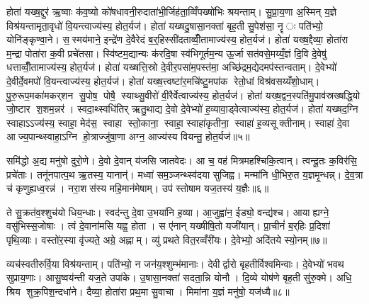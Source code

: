 होता॑ यख्ष॒द्दुर॑ ऋ॒ष्वाः क॑व॒ष्यो को॑षधावनी॒रुदाता॑भी॒र्जिह॑ता॒व्विँपख्षो॑भिः श्रयन्ताम्। सु॒प्रा॒य॒णा अ॒स्मिन् य॒ज्ञे विश्र॑यन्तामृता॒वृधो॑ वि॒यन्त्वाज्य॑स्य॒ होत॒र्यज॑। होता॑ यख्षदु॒षासा॒नक्ता॑ बृह॒ती सु॒पेश॑सा॒ नॄः पति॑भ्यो॒ योनि॑ङ्कृण्वा॒ने। स॒स्मय॑माने॒ इन्द्रे॑ण दे॒वैरेदं ब॒र्॒हिस्सी॑दताव्वीँ॒तामाज्य॑स्य॒ होत॒र्यज॑। होता॑ यख्ष॒द्दैव्या॒ होता॑रा म॒न्द्रा पोता॑रा क॒वी प्रचे॑तसा। स्वि॑ष्टम॒द्यान्यः क॑रदि॒षा स्व॑भिगूर्तम॒न्य ऊ॒र्जा सत॑वसे॒मय्यँ॒ज्ञं दि॒वि दे॒वेषु॑ धत्ताव्वीँ॒तामाज्य॑स्य॒ होत॒र्यज॑। होता॑ यख्षत्ति॒स्रो दे॒वीर॒पसा॑म॒पस्त॑मा॒ अच्छि॑द्रम॒द्येदमप॑स्तन्वताम्। दे॒वेभ्यो॑ दे॒वीर्दे॒वमपो॑ वि॒यन्त्वाज्य॑स्य॒ होत॒र्यज॑। होता॑ यख्ष॒त्त्वष्टा॑र॒मचि॑ष्टु॒मपा॑क रेतो॒धां विश्र॑वसय्यँशो॒धाम्। पु॒रु॒रूप॒मका॑मकर्‌शन सु॒पोष॒ पोषै॒ स्याथ्सु॒वीरो॑ वी॒रैर्वेत्वाज्य॑स्य॒ होत॒र्यज॑। होता॑ यख्ष॒द्वन॒स्पति॑मु॒पाव॑स्रख्षद्धि॒यो जो॒ष्टार श॒शम॒न्नर॑। स्वदा॒थ्स्वधि॑तिर् ऋतु॒थाद्य दे॒वो दे॒वेभ्यो॑ ह॒व्यावा॒ड्वेत्वाज्य॑स्य॒ होत॒र्यज॑। होता॑ यख्षद॒ग्नि स्वाहाऽऽज्य॑स्य॒ स्वाहा॒ मेद॑स॒ स्वाहा स्तो॒काना॒ स्वाहा॒ स्वाहा॑कृतीना॒ स्वाहा॑ ह॒व्यसूक्तीनाम्। स्वाहा॑ दे॒वा आज्य॒पान्थ्स्वाहा॒ऽग्नि हो॒त्राज्जु॑षा॒णा अग्न॒ आज्य॑स्य वियन्तु॒ होत॒र्यज॑॥५॥\anuvakamend[प्रि॒यमिन्द्र॑स्यास्तु॒ वेत्वाज्य॑स्य॒ होत॒र्यज॑ सु॒वीरो॑ वी॒रैर्वेत्वाज्य॑स्य॒ होत॒र्यज॑ च॒त्वारि॑ च (अ॒ग्निन्तनू॒नपा॑त॒न्नरा॒शस॑म॒ग्निमि॒ड ई॑डि॒तो ब॒र्‌हिर्दुर॑ उ॒षासा॒नक्ता॒ दैव्या॑ ति॒स्रस्त्वष्टा॑रं॒ वन॒स्पति॑म॒ग्निम्। पञ्च॒ वेत्वेको॑ वि॒यन्तु॒ द्विर्वी॒तामेको॑ वि॒यन्तु॒ द्विर्वेत्वेको॑ वियन्तु॒ होत॒र्यज॑ ॥ )]

समि॑द्धो अ॒द्य मनु॑षो दुरो॒णे। दे॒वो दे॒वान् य॑जसि जातवेदः। आ च॒ वह॑ मित्रमहश्चिकि॒त्वान्। त्वन्दू॒तः क॒विर॑सि॒ प्रचे॑ताः। तनू॑नपात्प॒थ ऋ॒तस्य॒ यानान्॑। मध्वा॑ सम॒ञ्जन्थ्स्व॑दया सुजिह्व। मन्मा॑नि धी॒भिरु॒त य॒ज्ञमृ॒न्धन्न्। दे॒व॒त्रा च॑ कृणुह्यध्व॒रन्न॑। नरा॒शस॑स्य महि॒मान॑मेषाम्। उप॑ स्तोषाम यज॒तस्य॑ य॒ज्ञैः॥६॥

ते सु॒क्रत॑व॒श्शुच॑यो धिय॒न्धाः। स्वद॑न्तु दे॒वा उ॒भया॑नि ह॒व्या। आ॒जुह्वा॑न॒ ईड्यो॒ वन्द्य॑श्च। आयाह्यग्ने॒ वसु॑भिस्स॒जोषाः। त्वं दे॒वाना॑मसि यह्व॒ होता। स ए॑नान् यख्षीषि॒तो यजी॑यान्। प्रा॒चीनं॑ ब॒र्‌हिः प्र॒दिशा॑ पृथि॒व्याः। वस्तो॑र॒स्या वृ॑ज्यते॒ अग्रे॒ अह्नाम्। व्यु॑ प्रथते वित॒रव्वँरी॑यः। दे॒वेभ्यो॒ अदि॑तये स्यो॒नम्॥७॥

व्यच॑स्वतीरुर्वि॒या विश्र॑यन्ताम्। पति॑भ्यो॒ न जन॑य॒श्शुम्भ॑मानाः। देवीर्द्वारो बृहतीर्विश्वमिन्वाः। दे॒वेभ्यो॑ भवथ सुप्राय॒णाः। आसु॒ष्वय॑न्ती यज॒ते उपा॑के। उ॒षासा॒नक्ता॑ सदता॒न्नि योनौ। दि॒व्ये योष॑णे बृह॒ती सु॑रु॒क्मे। अधि॒ श्रिय शुक्र॒पिश॒न्दधा॑ने। दैव्या॒ होता॑रा प्रथ॒मा सु॒वाचा। मिमा॑ना य॒ज्ञं मनु॑षो॒ यज॑ध्यै॥८॥


